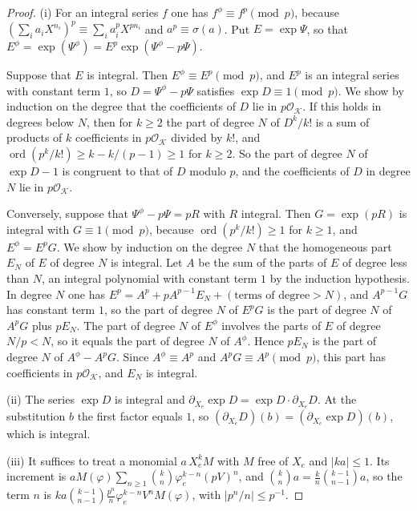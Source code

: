 \begin{proof}
(i) For an integral series $f$ one has $f^\phi\equiv f^p\pmod p$, because $(\sum_ia_iX^{n_i})^p\equiv\sum_ia_i^pX^{pn_i}$ and $a^p\equiv\sigma(a)$. Put $E=\exp\Psi$, so that $E^\phi=\exp(\Psi^\phi)=E^p\exp(\Psi^\phi-p\Psi)$.

Suppose that $E$ is integral. Then $E^\phi\equiv E^p\pmod p$, and $E^p$ is an integral series with constant term $1$, so $D=\Psi^\phi-p\Psi$ satisfies $\exp D\equiv1\pmod p$. We show by induction on the degree that the coefficients of $D$ lie in $p\mathcal O_{\mathcal K}$. If this holds in degrees below $N$, then for $k\ge2$ the part of degree $N$ of $D^k/k!$ is a sum of products of $k$ coefficients in $p\mathcal O_{\mathcal K}$ divided by $k!$, and $\operatorname{ord}(p^k/k!)\ge k-k/(p-1)\ge1$ for $k\ge2$. So the part of degree $N$ of $\exp D-1$ is congruent to that of $D$ modulo $p$, and the coefficients of $D$ in degree $N$ lie in $p\mathcal O_{\mathcal K}$.

Conversely, suppose that $\Psi^\phi-p\Psi=pR$ with $R$ integral. Then $G=\exp(pR)$ is integral with $G\equiv1\pmod p$, because $\operatorname{ord}(p^k/k!)\ge1$ for $k\ge1$, and $E^\phi=E^pG$. We show by induction on the degree $N$ that the homogeneous part $E_N$ of $E$ of degree $N$ is integral. Let $A$ be the sum of the parts of $E$ of degree less than $N$, an integral polynomial with constant term $1$ by the induction hypothesis. In degree $N$ one has $E^p=A^p+pA^{p-1}E_N+(\text{terms of degree}>N)$, and $A^{p-1}G$ has constant term $1$, so the part of degree $N$ of $E^pG$ is the part of degree $N$ of $A^pG$ plus $pE_N$. The part of degree $N$ of $E^\phi$ involves the parts of $E$ of degree $N/p<N$, so it equals the part of degree $N$ of $A^\phi$. Hence $pE_N$ is the part of degree $N$ of $A^\phi-A^pG$. Since $A^\phi\equiv A^p$ and $A^pG\equiv A^p\pmod p$, this part has coefficients in $p\mathcal O_{\mathcal K}$, and $E_N$ is integral.

(ii) The series $\exp D$ is integral and $\partial_{X_e}\exp D=\exp D\cdot\partial_{X_e}D$. At the substitution $b$ the first factor equals $1$, so $(\partial_{X_e}D)(b)=(\partial_{X_e}\exp D)(b)$, which is integral.

(iii) It suffices to treat a monomial $a\,X_e^kM$ with $M$ free of $X_e$ and $\lvert ka\rvert\le1$. Its increment is $aM(\varphi)\sum_{n\ge1}\binom kn\varphi_e^{k-n}(pV)^n$, and $\binom kna=\frac kn\binom{k-1}{n-1}a$, so the term $n$ is $ka\binom{k-1}{n-1}\frac{p^n}n\varphi_e^{k-n}V^nM(\varphi)$, with $\lvert p^n/n\rvert\le p^{-1}$.
\end{proof}

